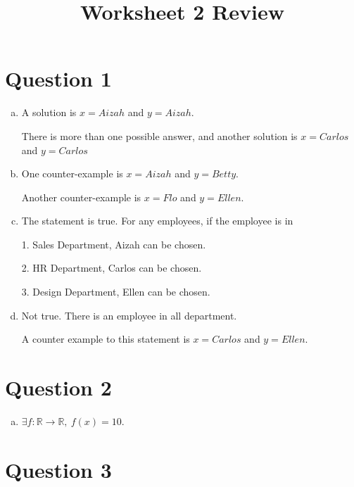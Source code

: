 \documentclass[12pt]{article}
\begin{document}
\title{Worksheet 2 Review}
\maketitle

\section*{Question 1}
\begin{enumerate}[a.]
    \item

    A solution is $x = Aizah$ and $y = Aizah$.

    \bigskip

    There is more than one possible answer, and another solution is $x = Carlos$
    and $y = Carlos$

    \item

    One counter-example is $x = Aizah$ and $y = Betty$.

    \bigskip

    Another counter-example is $x = Flo$ and $y = Ellen$.

    \item

    The statement is true. For any employees, if the employee is in

    \bigskip

    1. Sales Department, Aizah can be chosen.

    2. HR Department, Carlos can be chosen.

    3. Design Department, Ellen can be chosen.

    \item

    Not true. There is an employee in all department.

    \bigskip

    A counter example to this statement is $x = Carlos$ and $y = Ellen$.

\end{enumerate}

\section*{Question 2}
\begin{enumerate}[a.]
    \item

    $\exists f: \mathbb{R} \to \mathbb{R},\: f(x) = 10$.

\end{enumerate}

\section*{Question 3}
\end{document}
